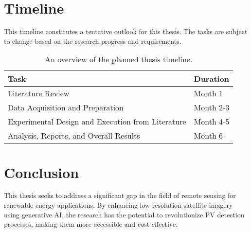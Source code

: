 \chapter{Timeline}\label{chapter:timeline}

This timeline constitutes a tentative outlook for this thesis. The tasks are subject to change based on the research progress and requirements.

\begin{table}[htpb]
  \caption[Thesis Timeline]{An overview of the planned thesis timeline.}\label{tab:timeline}
  \centering
  \begin{tabular}{ll}
    \toprule
    \textbf{Task} & \textbf{Duration} \\
    \midrule
    Literature Review & Month 1 \\
    Data Acquisition and Preparation & Month 2-3 \\
    Experimental Design and Execution from Literature & Month 4-5 \\
    Analysis, Reports, and Overall Results & Month 6 \\
    \bottomrule
  \end{tabular}
\end{table}

\chapter{Conclusion}\label{chapter:conclusion}

This thesis seeks to address a significant gap in the field of remote sensing for renewable energy applications. By enhancing low-resolution satellite imagery using generative AI, the research has the potential to revolutionize PV detection processes, making them more accessible and cost-effective.








